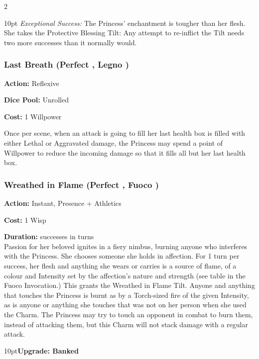 \begin{multicols}{2}
\begin{myindentpar}{10pt}
\emph{Exceptional Success:} The Princess' enchantment is tougher than her flesh. She takes the Protective Blessing Tilt: Any attempt to re-inflict the Tilt needs two more successes than it normally would.\end{myindentpar}

\subsubsection*{Last Breath (Perfect \textbullet\textbullet, Legno \textbullet\textbullet)}

\noindent \textbf{Action:} Reflexive

\noindent \textbf{Dice Pool:} Unrolled

\noindent \textbf{Cost:} 1 Willpower 

Once per scene, when an attack is going to fill her last health box is filled with either Lethal or Aggravated damage, the Princess may spend a point of Willpower to reduce the incoming damage so that it fills all but her last health box. 

\subsubsection*{Wreathed in Flame (Perfect \textbullet\textbullet, Fuoco \textbullet)}

\noindent \textbf{Action:} Instant, Presence + Athletics

\noindent \textbf{Cost:} 1 Wisp

\noindent \textbf{Duration:} successes in turns \\

\noindent Passion for her beloved ignites in a fiery nimbus, burning anyone who interferes with the Princess. She chooses someone she holds in affection. For 1 turn per success, her flesh and anything she wears or carries is a source of flame, of a colour and Intensity set by the affection's nature and strength (see table in the Fuoco Invocation.) This grants the Wreathed in Flame Tilt.  Anyone and anything that touches the Princess is burnt as by a Torch-sized fire of the given Intensity, as is anyone or anything she touches that was not on her person when she used the Charm. The Princess may try to touch an opponent in combat to burn them, instead of attacking them, but this Charm will not stack damage with a regular attack. 

\begin{myindentpar}{10pt}\textbf{Upgrade: Banked}


\end{myindentpar}
\end{multicols}

